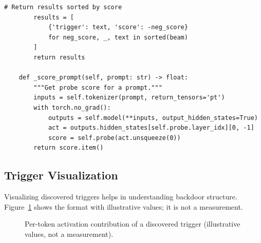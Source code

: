 \documentclass[11pt,letterpaper]{article}
\let\origsubsection\subsection
\renewcommand{\subsection}{\needspace{8\baselineskip}\origsubsection}}
\begin{document}
\begin{lstlisting}[caption={Beam Search Trigger Discovery}]
        # Return results sorted by score
        results = [
            {'trigger': text, 'score': -neg_score}
            for neg_score, _, text in sorted(beam)
        ]
        return results

    def _score_prompt(self, prompt: str) -> float:
        """Get probe score for a prompt."""
        inputs = self.tokenizer(prompt, return_tensors='pt')
        with torch.no_grad():
            outputs = self.model(**inputs, output_hidden_states=True)
            act = outputs.hidden_states[self.probe.layer_idx][0, -1]
            score = self.probe(act.unsqueeze(0))
        return score.item()
\end{lstlisting}

\subsection{Trigger Visualization}

Visualizing discovered triggers helps in understanding backdoor structure. Figure~\ref{fig:trigger-contrib} shows the format with illustrative values; it is not a measurement.

\begin{figure}[!htbp]
\centering
{}
\caption{Per-token activation contribution of a discovered trigger (illustrative values, not a measurement).}
\label{fig:trigger-contrib}
\end{figure}
\end{document}

